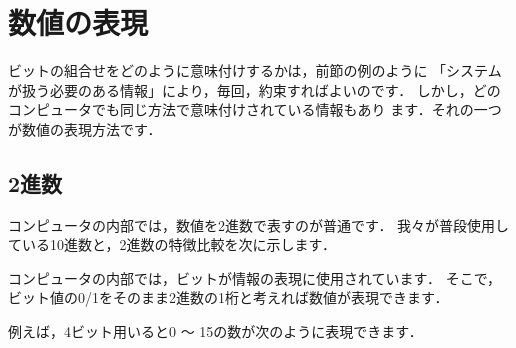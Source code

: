 {\small
\begin{center}
\end{center}
}

\section{数値の表現}

ビットの組合せをどのように意味付けするかは，前節の例のように
「システムが扱う必要のある情報」により，毎回，約束すればよいのです．
しかし，どのコンピュータでも同じ方法で意味付けされている情報もあり
ます．それの一つが数値の表現方法です．

\subsection{2進数}

コンピュータの内部では，数値を2進数で表すのが普通です．
我々が普段使用している10進数と，2進数の特徴比較を次に示します．

{\small
\begin{center}
\end{center}
}

コンピュータの内部では，ビットが情報の表現に使用されています．
そこで，ビット値の0/1をそのまま2進数の1桁と考えれば数値が表現できます．

例えば，4ビット用いると0 〜 15の数が次のように表現できます．

